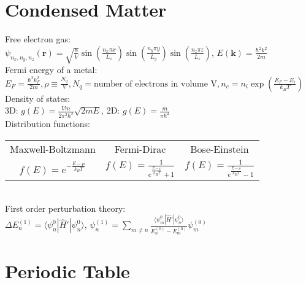\documentclass[12pt,a4paper]{article}
\begin{document}
\section*{Condensed Matter}
Free electron gas:\\[.15in]
$\psi_{n_x, n_y, n_z}(\mathbf{r}) = \sqrt{\frac{8}{V}} \sin\left(\frac{n_x \pi x}{L_x}\right) \sin\left(\frac{n_y \pi y}{L_y}\right) \sin\left(\frac{n_z \pi z}{L_z}\right)
$, \hspace*{5pt} $E(\mathbf{k}) = \frac{\hbar^2 k^2}{2m}
$\\[.15in]
Fermi energy of a metal:\\[.15in]
$E_F = \frac{\hbar^2 k_F^2}{2m}, \rho \equiv \frac{N_q}{V}, N_q = \text{number of electrons in volume V}, n_c = n_i \exp (\frac{E_F - E_i}{k_B T})$\\[.15in]
Density of states:\\[.15in]
3D: $g(E) = \frac{V m}{2\pi^2 \hbar^3} \sqrt{2mE}$, 2D: $g(E) = \frac{m}{\pi \hbar^2}$\\[.15in]
Distribution functions:\\
\begin{tabular}{ccc}
	Maxwell-Boltzmann & Fermi-Dirac & Bose-Einstein\\
	$f(E) = e^{-\frac{E - \mu}{k_B T}}$ & $f(E) = \frac{1}{e^{\frac{E - \mu}{k_B T}} + 1}$ & $f(E) = \frac{1}{e^{\frac{E - \mu}{k_B T}} - 1}
	$\\[.15in]
\end{tabular}\\[.15in]
First order perturbation theory:\\[.15in]
$\Delta E_n^{(1)} = \langle \psi_n^0 | \hat{H}' | \psi_n^0 \rangle$,
$\psi_n^{(1)} = \sum_{m \neq n} \frac{\langle \psi_m^0 | \hat{H}' | \psi_n^0 \rangle}{E_n^{(0)} - E_m^{(0)}} \psi_m^{(0)}$

	
	
	\section*{Periodic Table}
\newcommand{\ElemLabel}[4]{
	\begin{minipage}{2.2cm}
		\centering
		{\textbf{#1} \hfill #2}%
		\linebreak \linebreak
		{\textbf{#3}}%
		\linebreak \linebreak
		{{#4}}
	\end{minipage}
}
\end{document}

